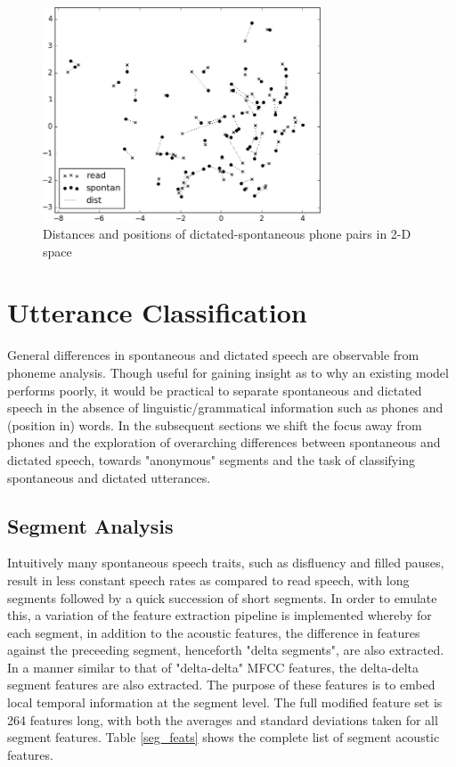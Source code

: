 \documentclass[conference]{IEEEtran}
\begin{document}
\begin{figure}[!htb]
\centering
\includegraphics[width=3.25in]{perphon_dist1}
    \caption{Distances and positions of dictated-spontaneous phone pairs in 2-D space}
\label{phon_pca}
\end{figure}

\section{Utterance Classification}

General differences in spontaneous and dictated speech are observable from phoneme analysis.
Though useful for gaining insight as to why an existing model performs poorly, it would be practical to separate spontaneous and dictated speech in the absence of linguistic/grammatical information such as phones and (position in) words.
In the subsequent sections we shift the focus away from phones and the exploration of overarching differences between spontaneous and dictated speech, towards "anonymous" segments and the task of classifying spontaneous and dictated utterances.

\subsection{Segment Analysis}

Intuitively many spontaneous speech traits, such as disfluency and filled pauses, result in less constant speech rates as compared to read speech, with long segments followed by a quick succession of short segments.
In order to emulate this, a variation of the feature extraction pipeline is implemented whereby for each segment, in addition to the acoustic features, the difference in features against the preceeding segment, henceforth "delta segments", are also extracted.
In a manner similar to that of "delta-delta" MFCC features, the delta-delta segment features are also extracted.
The purpose of these features is to embed local temporal information at the segment level.
The full modified feature set is 264 features long, with both the averages and standard deviations taken for all segment features.
Table \ref{seg_feats} shows the complete list of segment acoustic features.
\end{document}
